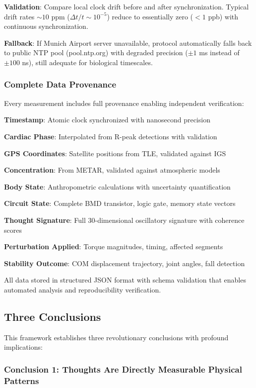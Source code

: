 \documentclass[11pt,onecolumn]{article}
\begin{document}
\textbf{Validation}: Compare local clock drift before and after synchronization. Typical drift rates $\sim 10$ ppm ($\Delta t / t \sim 10^{-5}$) reduce to essentially zero ($< 1$ ppb) with continuous synchronization.

\textbf{Fallback}: If Munich Airport server unavailable, protocol automatically falls back to public NTP pool (pool.ntp.org) with degraded precision ($\pm 1$ ms instead of $\pm 100$ ns), still adequate for biological timescales.

\subsubsection{Complete Data Provenance}

Every measurement includes full provenance enabling independent verification:

\textbf{Timestamp}: Atomic clock synchronized with nanosecond precision

\textbf{Cardiac Phase}: Interpolated from R-peak detections with validation

\textbf{GPS Coordinates}: Satellite positions from TLE, validated against IGS

\textbf{ Concentration}: From METAR, validated against atmospheric models

\textbf{Body State}: Anthropometric calculations with uncertainty quantification

\textbf{Circuit State}: Complete BMD transistor, logic gate, memory state vectors

\textbf{Thought Signature}: Full 30-dimensional oscillatory signature with coherence scores

\textbf{Perturbation Applied}: Torque magnitudes, timing, affected segments

\textbf{Stability Outcome}: COM displacement trajectory, joint angles, fall detection

All data stored in structured JSON format with schema validation that enables automated analysis and reproducibility verification.

\subsection{Three Conclusions}

This framework establishes three revolutionary conclusions with profound implications:

\subsubsection{Conclusion 1: Thoughts Are Directly Measurable Physical Patterns}
\end{document}
